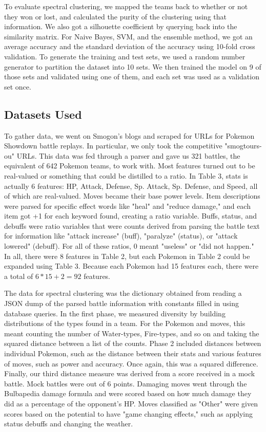 \documentclass{acm_proc_article-sp}
\begin{document}
To evaluate spectral clustering, we mapped the teams back to whether or not they won or lost, and calculated the purity of the clustering using that information. We also got a silhouette coefficient by querying back into the similarity matrix. For Naive Bayes, SVM, and the ensemble method, we got an average accuracy and the standard deviation of the accuracy using 10-fold cross validation. To generate the training and test sets, we used a random number generator to partition the dataset into 10 sets. We then trained the model on 9 of those sets and validated using one of them, and each set was used as a validation set once.

\subsection{Datasets Used}

To gather data, we went on Smogon's blogs and scraped for URLs for Pokemon Showdown battle replays. In particular, we only took the competitive "smogtours-ou" URLs. This data was fed through a parser and gave us 321 battles, the equivalent of 642 Pokemon teams, to work with. Most features turned out to be real-valued or something that could be distilled to a ratio. In Table 3, stats is actually 6 features: HP, Attack, Defense, Sp. Attack, Sp. Defense, and Speed, all of which are real-valued. Moves became their base power levels. Item descriptions were parsed for specific effect words like "heal" and "reduce damage," and each item got +1 for each keyword found, creating a ratio variable. Buffs, status, and debuffs were ratio variables that were counts derived from parsing the battle text for information like "attack increase" (buff), "paralyze" (status), or "attack lowered" (debuff). For all of these ratios, 0 meant "useless" or "did not happen." In all, there were 8 features in Table 2, but each Pokemon in Table 2 could be expanded using Table 3. Because each Pokemon had 15 features each, there were a total of $6 * 15 + 2 = 92$ features.

The data for spectral clustering was the dictionary obtained from reading a JSON dump of the parsed battle information with constants filled in using database queries. In the first phase, we measured diversity by building distributions of the types found in a team. For the Pokemon and moves, this meant counting the number of Water-types, Fire-types, and so on and taking the squared distance between a list of the counts. Phase 2 included distances between individual Pokemon, such as the distance between their stats and various features of moves, such as power and accuracy. Once again, this was a squared difference. Finally, our third distance measure was derived from a score received in a mock battle. Mock battles were out of 6 points. Damaging moves went through the Bulbapedia damage formula and were scored based on how much damage they did as a percentage of the opponent's HP. Moves classified as "Other" were given scores based on the potential to have "game changing effects," such as applying status debuffs and changing the weather.
\end{document}
